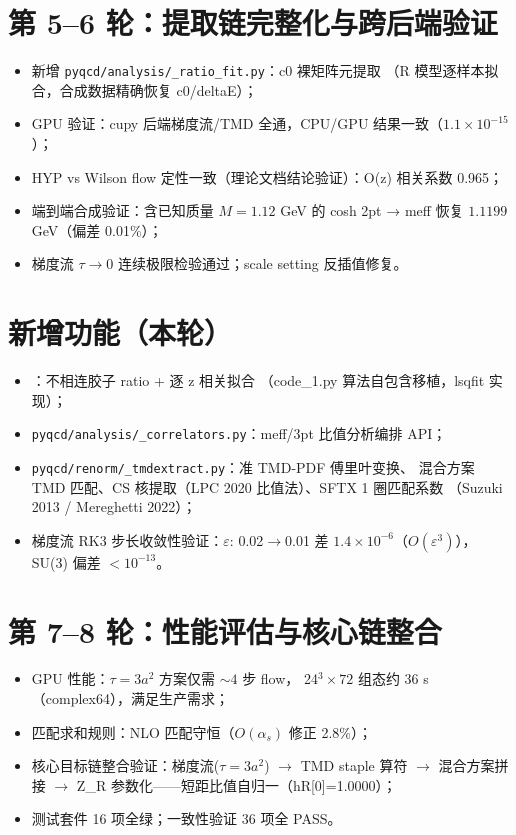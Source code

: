 \documentclass[12pt,a4paper]{ctexart}
\begin{document}
\section{第 5--6 轮：提取链完整化与跨后端验证}

\begin{itemize}
  \item 新增 \texttt{pyqcd/analysis/\_ratio\_fit.py}：c0 裸矩阵元提取
        （R 模型逐样本拟合，合成数据精确恢复 c0/deltaE）；
  \item GPU 验证：cupy 后端梯度流/TMD 全通，CPU/GPU 结果一致（$1.1\times10^{-15}$）；
  \item HYP vs Wilson flow 定性一致（理论文档结论验证）：O(z) 相关系数 0.965；
  \item 端到端合成验证：含已知质量 $M=1.12$ GeV 的 cosh 2pt →
        meff 恢复 $1.1199$ GeV（偏差 0.01\%）；
  \item 梯度流 $\tau\to 0$ 连续极限检验通过；scale setting 反插值修复。
\end{itemize}

\section{新增功能（本轮）}

\begin{itemize}
  \item {}：不相连胶子 ratio + 逐 z 相关拟合
        （code\_1.py 算法自包含移植，lsqfit 实现）；
  \item \texttt{pyqcd/analysis/\_correlators.py}：meff/3pt 比值分析编排 API；
  \item \texttt{pyqcd/renorm/\_tmdextract.py}：准 TMD-PDF 傅里叶变换、
        混合方案 TMD 匹配、CS 核提取（LPC 2020 比值法）、SFTX 1 圈匹配系数
        （Suzuki 2013 / Mereghetti 2022）；
  \item 梯度流 RK3 步长收敛性验证：$\varepsilon$: 0.02$\rightarrow$0.01 差
        $1.4\times10^{-6}$（$O(\varepsilon^3)$），SU(3) 偏差 $<10^{-13}$。
\end{itemize}

\section{第 7--8 轮：性能评估与核心链整合}

\begin{itemize}
  \item GPU 性能：$\tau = 3a^2$ 方案仅需 $\sim 4$ 步 flow，
        24$^3\times72$ 组态约 36 s（complex64），满足生产需求；
  \item 匹配求和规则：NLO 匹配守恒（$O(\alpha_s)$ 修正 2.8\%）；
  \item 核心目标链整合验证：梯度流($\tau{=}3a^2$) $\to$ TMD staple 算符
        $\to$ 混合方案拼接 $\to$ Z\_R 参数化——短距比值自归一（hR[0]=1.0000）；
  \item 测试套件 16 项全绿；一致性验证 36 项全 PASS。
\end{itemize}
\end{document}
